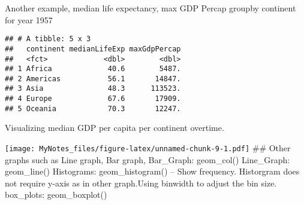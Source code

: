 \documentclass[]{article}
\newenvironment{Shaded}{\begin{snugshade}}{\end{snugshade}}
\newcommand{\KeywordTok}[1]{\textcolor[rgb]{0.13,0.29,0.53}{\textbf{#1}}}
\newcommand{\DataTypeTok}[1]{\textcolor[rgb]{0.13,0.29,0.53}{#1}}
\newcommand{\DecValTok}[1]{\textcolor[rgb]{0.00,0.00,0.81}{#1}}
\newcommand{\StringTok}[1]{\textcolor[rgb]{0.31,0.60,0.02}{#1}}
\newcommand{\CommentTok}[1]{\textcolor[rgb]{0.56,0.35,0.01}{\textit{#1}}}
\newcommand{\OperatorTok}[1]{\textcolor[rgb]{0.81,0.36,0.00}{\textbf{#1}}}
\newcommand{\NormalTok}[1]{#1}
\begin{document}
Another example, median life expectancy, max GDP Percap groupby
continent for year 1957

\begin{Shaded}
\end{Shaded}

\begin{verbatim}
## # A tibble: 5 x 3
##   continent medianLifeExp maxGdpPercap
##   <fct>             <dbl>        <dbl>
## 1 Africa             40.6        5487.
## 2 Americas           56.1       14847.
## 3 Asia               48.3      113523.
## 4 Europe             67.6       17909.
## 5 Oceania            70.3       12247.
\end{verbatim}

Visualizing median GDP per capita per continent overtime.

\begin{Shaded}
\end{Shaded}

\texttt{[image: MyNotes\_files/figure-latex/unnamed-chunk-9-1.pdf]} \#\#
Other graphs such as Line graph, Bar graph, Bar\_Graph: geom\_col()
Line\_Graph: geom\_line() Histograms: geom\_histogram() -- Show
frequency. Historgram does not require y-axis as in other graph.Using
binwidth to adjust the bin size. box\_plots: geom\_boxplot()
\end{document}
